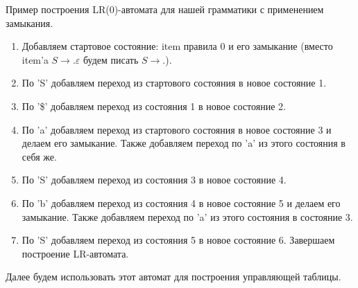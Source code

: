 \begin{example}
Пример построения LR(0)-автомата для нашей грамматики с применением замыкания.
\begin{enumerate}
\item Добавляем стартовое состояние: item правила 0 и его замыкание (вместо item'a $S \rightarrow .\varepsilon$ будем писать $S \rightarrow .$).



\item По 'S' добавляем переход из стартового состояния в новое состояние 1.



\item По '\$' добавляем переход из состояния 1 в новое состояние 2.



\item По 'a' добавляем переход из стартового состояния в новое состояние 3 и делаем его замыкание. Также добавляем переход по 'a' из этого состояния в себя же.



\item По 'S' добавляем переход из состояния 3 в новое состояние 4.



\item По 'b' добавляем переход из состояния 4 в новое состояние 5 и делаем его замыкание. Также добавляем переход по 'a' из этого состояния в состояние 3.




\item По 'S' добавляем переход из состояния 5 в новое состояние 6. Завершаем построение LR-автомата.



\end{enumerate}
\end{example}

Далее будем использовать этот автомат для построения управляющей таблицы.

